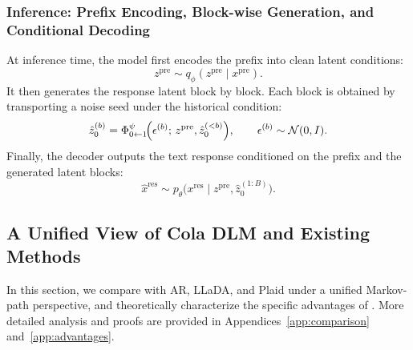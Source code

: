 \subsubsection{Inference: Prefix Encoding, Block-wise Generation, and Conditional Decoding}

At inference time, the model first encodes the prefix into clean latent conditions:
\begin{equation}
z^{\mathrm{pre}}\sim q_\phi(z^{\mathrm{pre}}\mid x^{\mathrm{pre}}).
\label{eq:main_prefix_encode}
\end{equation}
It then generates the response latent block by block. Each block is obtained by transporting a noise seed under the historical condition:
\begin{equation}
\hat z_0^{(b)}
=
\Phi^\psi_{0\leftarrow 1}
\!\Bigl(\epsilon^{(b)};\,z^{\mathrm{pre}},\hat z_0^{(<b)}\Bigr),
\qquad
\epsilon^{(b)}\sim\mathcal N(0,I).
\label{eq:main_block_generation}
\end{equation}
Finally, the decoder outputs the text response conditioned on the prefix and the generated latent blocks:
\begin{equation}
\hat x^{\mathrm{res}}
\sim
p_\theta\!\bigl(x^{\mathrm{res}}\mid z^{\mathrm{pre}},\hat z_0^{(1:B)}\bigr).
\label{eq:main_decode}
\end{equation}


\subsection{A Unified View of Cola DLM and Existing Methods}
In this section, we compare \method with AR, LLaDA, and Plaid under a unified Markov-path perspective, and theoretically characterize the specific advantages of \method. More detailed analysis and proofs are provided in Appendices~\ref{app:comparison} and~\ref{app:advantages}.
